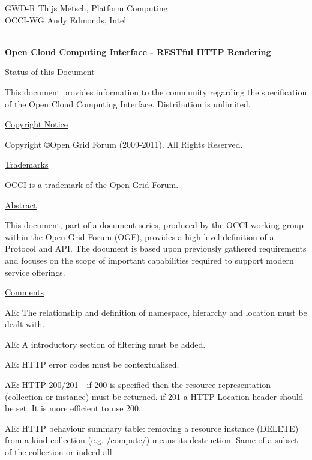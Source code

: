 \documentclass[10pt,a4paper]{article}
\begin{document}
\thispagestyle{empty}

GWD-R \hfill Thijs Metsch, Platform Computing\\
OCCI-WG \hfill Andy Edmonds, Intel\\
\\

\vspace*{0.5in}

\begin{Large}
\textbf{Open Cloud Computing Interface - RESTful HTTP Rendering}
\end{Large}

\vspace*{0.5in}

\underline{Status of this Document}

This document provides information to the community regarding the
specification of the Open Cloud Computing Interface. Distribution is
unlimited.

\underline{Copyright Notice}

Copyright \copyright Open Grid Forum (2009-2011). All Rights Reserved.

\underline{Trademarks}

OCCI is a trademark of the Open Grid Forum.

\underline{Abstract}

This document, part of a document series, produced by the OCCI working
group within the Open Grid Forum (OGF), provides a high-level
definition of a Protocol and API. The document is based upon
previously gathered requirements and focuses on the scope of important
capabilities required to support modern service offerings.

\underline{Comments}

AE: The relationship and definition of namespace, hierarchy and location must be dealt with.

AE: A introductory section of filtering must be added.

AE: HTTP error codes must be contextualised.

AE: HTTP 200/201 - if 200 is specified then the resource representation (collection or instance) 
must be returned. if 201 a HTTP Location header should be set. It is more efficient to use 200.

AE: HTTP behaviour summary table: removing a resource instance (DELETE) from a kind 
collection (e.g. /compute/) means its destruction. Same of a subset of the collection or indeed all.
\end{document}
